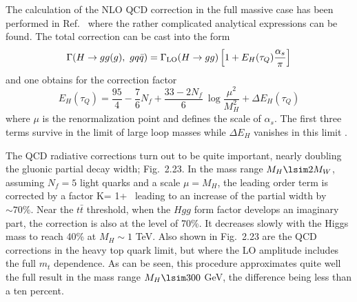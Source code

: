 The calculation of the NLO QCD correction in the full massive case has been 
performed in Ref.~\cite{SDGZ} where the rather complicated analytical 
expressions can be found. The total correction can be cast into the form 
\begin{equation}
\Gamma(H\rightarrow gg(g),~gq\bar q) = \Gamma_{\rm LO}(H\rightarrow gg)
\left[ 1 + E_H(\tau_Q) \frac{\alpha_s}{\pi} \right]
\end{equation}
and one obtains for the correction factor
\begin{equation}
E_H(\tau_Q) = \frac{95}{4} - \frac{7}{6} N_f
+ \frac{33-2N_f}{6}\ \log \frac{\mu^2}{M_H^2} + \Delta E_H (\tau_Q)
\label{Hgg-EH}
\end{equation}
where $\mu$ is the renormalization point and defines the scale of $\alpha_s$. 
The first three terms survive in the limit of large loop masses while $\Delta
E_H$ vanishes in this limit \cite{Inami+Kubota,HggQCD,AggQCD,HggExp}. \s
 
The QCD radiative corrections turn out to be quite important, nearly doubling 
the gluonic partial decay width; Fig.~2.23.  In the mass range $M_H \lsim
2M_W$, assuming $N_f=5$ light quarks and a scale $\mu=M_H$, the leading order 
term is corrected by a factor 
\beq
K= 1+  \, 
\eeq
leading to an increase of the partial width by $\sim 70\%$. Near the $t\bar{t}$ 
threshold, when the $Hgg$ form factor develops an imaginary part, the 
correction is also at the level of 70\%. It decreases slowly with the Higgs 
mass to reach 40\% at $M_H \sim 1$ TeV. Also shown in Fig.~2.23 are the QCD 
corrections in the heavy top quark limit, but where the LO amplitude
includes the full $m_t$ dependence. As can be seen, this procedure approximates 
quite well the full result in the mass range $M_H \lsim 300$ GeV, the 
difference being less than a ten percent.\s

\begin{figure}[!h]
\begin{center}
\vspace*{-2.5cm}
\hspace*{-3cm}
\end{center}
\vspace*{-13.8cm}
\vspace*{-.3cm}
\end{figure}

